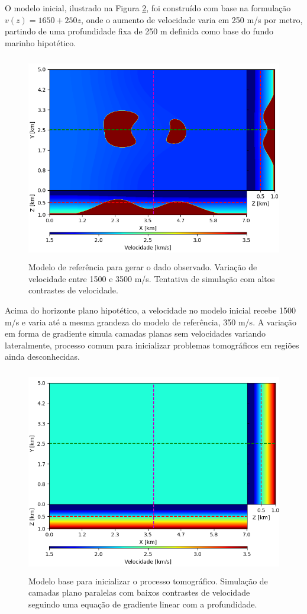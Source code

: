 O modelo inicial, ilustrado na Figura \ref{fig:init_model}, foi construído com base na formulação $v(z) = 1650 + 250z$, onde o aumento de velocidade varia em 250 m/s por metro, partindo de uma profundidade fixa de 250 m definida como base do fundo marinho hipotético.  
\begin{figure}[H]
	\centering
	\includegraphics[width=12cm,height=9cm]{Imgs/Metodologia/true_model.png}
	\caption{Modelo de referência para gerar o dado observado. Variação de velocidade entre 1500 e 3500 m/s. Tentativa de simulação com altos contrastes de velocidade.}
	\label{fig:true_model}	
\end{figure}
Acima do horizonte plano hipotético, a velocidade no modelo inicial recebe 1500 m/s e varia até a mesma grandeza do modelo de referência, 350 m/s. A variação em forma de gradiente simula camadas planas sem velocidades variando lateralmente, processo comum para inicializar problemas tomográficos em regiões ainda desconhecidas. 
\begin{figure}[H]
	\centering
	\includegraphics[width=12cm,height=9cm]{Imgs/Metodologia/init_model.png}
	\caption{Modelo base para inicializar o processo tomográfico. Simulação de camadas plano paralelas com baixos contrastes de velocidade seguindo uma equação de gradiente linear com a profundidade.}
	\label{fig:init_model}	
\end{figure}


